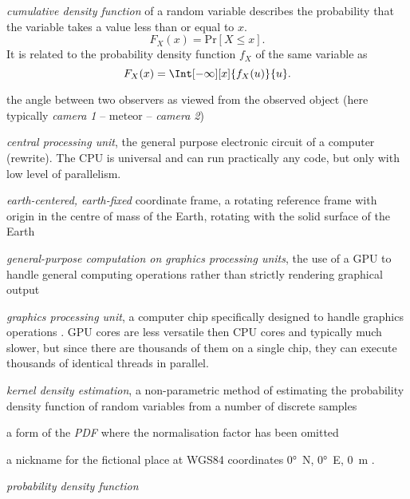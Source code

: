 \begin{description}[labelindent=0mm, leftmargin=40mm]
    \item[CDF]
        \emph{cumulative density function} of a random variable describes the probability that the
        variable takes a value less than or equal to $x$.
        \[
            F_X(x) = \mathrm{Pr}[X \leq x].
        \]
        It is related to the probability density function $f_X$ of the same variable as
        \[
            F_X(x) = \Int[-\infty][x]{f_X(u)}{u}.
        \]
    \item[convergence angle]
        the angle between two observers as viewed from the observed object (here typically \emph{camera 1} -- meteor -- \emph{camera 2})
    \item[CPU]
        \emph{central processing unit}, the general purpose electronic circuit of a computer \cite{...} (rewrite).
        The CPU is universal and can run practically any code, but only with low level of parallelism.
    \item[ECEF]
        \emph{earth-centered, earth-fixed} coordinate frame, a rotating reference frame with origin
        in the centre of mass of the Earth, rotating with the solid surface of the Earth \citep{ecef}
    \item[GPGPU]
        \emph{general-purpose computation on graphics processing units},
        the use of a GPU to handle general computing operations rather than strictly rendering graphical output \citep{techterms}
    \item[GPU]
        \emph{graphics processing unit}, a computer chip specifically designed to handle graphics operations \citep{techterms}.
        GPU cores are less versatile then CPU cores and typically much slower, but since there are thousands of them on a single
        chip, they can execute thousands of identical threads in parallel.
    \item[KDE]
        \emph{kernel density estimation}, a non-parametric method of estimating the probability density function
        of random variables from a number of discrete samples \citep{kde}
    \item[kernel]
        a form of the \emph{PDF} where the normalisation factor has been omitted
    \item[Null Island]
        a nickname for the fictional place at WGS84 coordinates \ang{0}~N, \ang{0}~E, \SI{0}{\metre} \citep{null-island}.
    \item[PDF]
        \emph{probability density function} 
    \item[SIMD]

\end{description}
